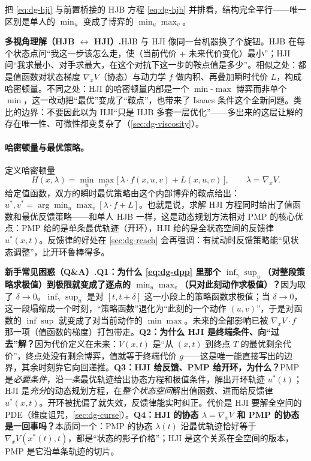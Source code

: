 把 \cref{eq:dg-hji} 与前置桥接的 HJB 方程 \cref{eq:dg-hjb} 并排看，结构完全平行——唯一区别是单人的 $\min_u$ 变成了博弈的 $\min_u\max_v$。

\begin{note}
\textbf{多视角理解（HJB $\leftrightarrow$ HJI）.}\;HJB 与 HJI 像同一台机器换了个旋钮。HJB 在每个状态点问“我这一步该怎么走，使（当前代价 + 未来代价变化）最小”；HJI 问“我求最小、对手求最大，在这个对抗下这一步的鞍点值是多少”。相似之处：都是值函数对状态梯度 $\nabla_x V$（协态）与动力学 $f$ 做内积、再叠加瞬时代价 $L$，构成哈密顿量。不同之处：HJI 的哈密顿量内部是一个 $\min$-$\max$ 博弈而非单个 $\min$，这一改动把“最优”变成了“鞍点”，也带来了 Isaacs 条件这个全新问题。类比的边界：不要因此以为 HJI“只是 HJB 多套一层优化”——多出来的这层让解的存在唯一性、可微性都变复杂了（\cref{sec:dg-viscosity}）。
\end{note}

\paragraph{哈密顿量与最优策略。}
定义哈密顿量
\begin{equation}
  H(x,\lambda)=\min_u\max_v\big[\,\lambda\cdot f(x,u,v)+L(x,u,v)\,\big],\qquad \lambda=\nabla_x V.
  \label{eq:dg-ham}
\end{equation}
给定值函数，双方的瞬时最优策略由这个内部博弈的鞍点给出：$u^*,v^*=\arg\min_u\max_v[\lambda\cdot f+L]$。也就是说，求解 HJI 方程同时给出了值函数和最优反馈策略——和单人 HJB 一样，这是动态规划方法相对 PMP 的核心优点：PMP 给的是单条最优轨迹（开环），HJI 给的是全状态空间的反馈律 $u^*(x,t)$。反馈律的好处在 \cref{sec:dg-reach} 会再强调：有扰动时反馈策略能“见状态调整”，比开环鲁棒得多。

\begin{note}
\textbf{新手常见困惑（Q\&A）.}\;\textbf{Q1：为什么 \cref{eq:dg-dpp} 里那个 $\inf_\gamma\sup_u$（对整段策略求极值）到极限就变成了逐点的 $\min_u\max_v$（只对此刻动作求极值）？}\;因为取了 $\delta\to0$。$\inf_\gamma\sup_u$ 是对 $[t,t+\delta]$ 这一小段上的策略函数求极值；当 $\delta\to0$，这一段塌缩成一个时刻，“策略函数”退化为“此刻的一个动作 $(u,v)$”，于是对函数的 $\inf\sup$ 就变成了对当前动作的 $\min\max$。未来的全部影响已被 $\nabla_x V\cdot f$ 那一项（值函数的梯度）打包带走。\textbf{Q2：为什么 HJI 是终端条件、向“过去”解？}\;因为代价定义在未来：$V(x,t)$ 是“从 $(x,t)$ 到终点 $T$ 的最优剩余代价”，终点处没有剩余博弈，值就等于终端代价 $g$——这是唯一能直接写出的边界，其余时刻靠它向回递推。\textbf{Q3：HJI 给反馈、PMP 给开环，为什么？}\;PMP 是\emph{必要条件}，沿\emph{一条}最优轨迹给出协态方程和极值条件，解出开环轨迹 $u^*(t)$；HJI 是\emph{充分}的动态规划方程，在\emph{整个状态空间}解出值函数、进而给反馈律 $u^*(x,t)$。开环被扰偏了就失效，反馈律能实时纠正。代价是 HJI 要解全空间的 PDE（维度诅咒，\cref{sec:dg-curse}）。\textbf{Q4：HJI 的协态 $\lambda=\nabla_x V$ 和 PMP 的协态是一回事吗？}\;本质同一个：PMP 的协态 $\lambda(t)$ 沿最优轨迹恰好等于 $\nabla_x V(x^*(t),t)$，都是“状态的影子价格”；HJI 是这个关系在全空间的版本，PMP 是它沿单条轨迹的切片。
\end{note}

